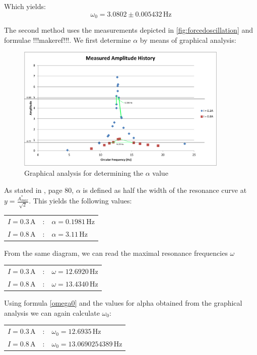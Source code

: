 \documentclass{scrreprt}
\newcommand{\unit}[1]{\ensuremath{\, \mathrm{#1}}}
\begin{document}
Which yields:
\begin{equation}
\omega_0 = 3.0802 \pm 0.005432 \unit{Hz}
\end{equation}

The second method uses the measurements depicted in \ref{fig:forcedoscillation} and formulae !!!makeref!!!.
We first determine $\alpha$ by means of graphical analysis:

\begin{figure}[H]
	\centering
  \includegraphics[width=0.9\textwidth]{diag/Width_measurement.png}
	\caption{Graphical analysis for determining the $\alpha$ value}
	\label{fig:graphical}
\end{figure}

As stated in \cite{physcript13}, page 80, $\alpha$ is defined as half the width of the resonance curve at $y=\frac{A^*_{max}}{\sqrt{2}}$. This yields the following values:

\begin{table}[h]
\center
\begin{tabular}{lcl}
$I = 0.3 \unit{A}$ &:& $\alpha = 0.1981\unit{Hz}$\\
$I = 0.8 \unit{A}$ &:& $\alpha = 3.11\unit{Hz}$
\end{tabular}
\end{table}

From the same diagram, we can read the maximal resonance frequencies $\omega$

\begin{table}[h]
\center
\begin{tabular}{lcl}
$I = 0.3 \unit{A}$ &:& $\omega = 12.6920\unit{Hz}$\\
$I = 0.8 \unit{A}$ &:& $\omega = 13.4340
\unit{Hz}$
\end{tabular}
\end{table}

Using formula \ref{omega0} and the values for alpha obtained from the graphical analysis we can again calculate $\omega_0$:
\begin{table}[h]
\center
\begin{tabular}{lcl}
$I = 0.3 \unit{A}$ &:& $\omega_0 = 12.6935\unit{Hz}$\\
$I = 0.8 \unit{A}$ &:& $\omega_0 = 13.0690254389
\unit{Hz}$
\end{tabular}
\end{table}
\end{document}
